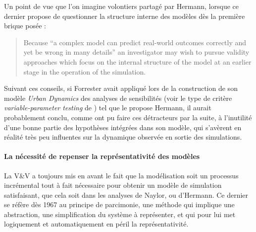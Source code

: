 Un point de vue que l'on imagine volontiers partagé par Hermann, lorsque ce dernier propose de questionner la structure interne des modèles dès la première brique posée :

\foreignblockquote{english}[{\cite[226]{Hermann1967}}]{Because \enquote{a complex model can predict real-world outcomes correctly and yet be wrong in many details} \autocite[64]{Pool1965} an investigator may wish to pursue validity approaches which focus on the internal structure of the model at an earlier stage in the operation of the simulation.} 

Suivant ces conseils, si Forrester avait appliqué lors de la construction de son modèle \textit{Urban Dynamics} des analyses de sensibilités (voir le type de critère \textit{variable-parameter testing} de \autocite{Hermann1967}) tel que le propose Hermann, il aurait probablement conclu, comme ont pu faire ces détracteurs par la suite, à l'inutilité d'une bonne partie des hypothèses intégrées dans son modèle, qui s'avèrent en réalité très peu influentes sur la dynamique observée en sortie des simulations.

\paragraph{La nécessité de repenser la représentativité des modèles}
\label{p:repenser la representativite}

La V\&V a toujours mis en avant le fait que la modélisation soit un processus incrémental tout à fait nécessaire pour obtenir un modèle de simulation satisfaisant, que cela soit dans les analyses de Naylor, ou d'Hermann. Ce dernier se réfère dès 1967 au principe de parcimonie, une méthode qui implique une abstraction, une simplification du système à représenter, et qui pour lui met logiquement et automatiquement en péril la représentativité.




